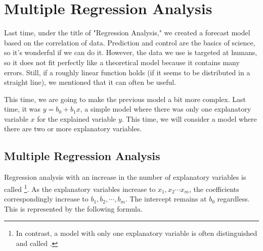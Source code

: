 \documentclass{ltjbook}
\begin{document}
\chapter{Multiple Regression Analysis}
\label{m10_MultipleRegression}

Last time, under the title of "Regression Analysis," we created a forecast model based on the correlation of data. Prediction and control are the basics of science, so it's wonderful if we can do it.
However, the data we use is targeted at humans, so it does not fit perfectly like a theoretical model because it contains many errors. Still, if a roughly linear function holds (if it seems to be distributed in a straight line), we mentioned that it can often be useful.

This time, we are going to make the previous model a bit more complex. Last time, it was $y=b_0+b_1x$, a simple model where there was only one explanatory variable $x$ for the explained variable $y$. This time, we will consider a model where there are two or more explanatory variables.

\section{Multiple Regression Analysis}
Regression analysis with an increase in the number of explanatory variables is called \footnote{In contrast, a model with only one explanatory variable is often distinguished and called .}. As the explanatory variables increase to $x_1, x_2\cdots x_m$, the coefficients correspondingly increase to $b_1, b_2,\cdots,b_m$. The intercept remains at $b_0$ regardless. This is represented by the following formula.
\end{document}
